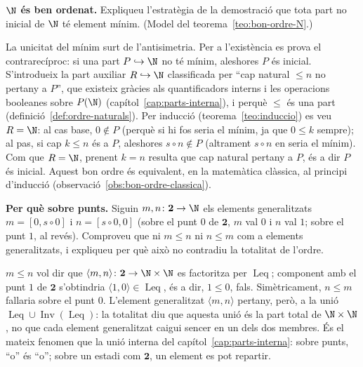 \begin{exercici}
\textbf{\(\N\) és ben ordenat.} Expliqueu l'estratègia de la demostració que tota part no inicial de \(\N\) té element mínim. (Model del teorema~\ref{teo:bon-ordre-N}.)
\end{exercici}
\begin{solucio}
La unicitat del mínim surt de l'antisimetria. Per a l'existència es prova el contrarecíproc: si una part \(P\hookrightarrow\N\) no té mínim, aleshores \(P\) és inicial. S'introdueix la part auxiliar \(R\hookrightarrow\N\) classificada per \enquote{cap natural \(\le n\) no pertany a \(P\)}, que existeix gràcies als quantificadors interns i les operacions booleanes sobre \(P(\N)\) (capítol~\ref{cap:parts-interna}), i perquè \(\le\) és una part (definició~\ref{def:ordre-naturals}). Per inducció (teorema~\ref{teo:induccio}) es veu \(R=\N\): al cas base, \(0\notin P\) (perquè si hi fos seria el mínim, ja que \(0\le k\) sempre); al pas, si cap \(k\le n\) és a \(P\), aleshores \(s\circ n\notin P\) (altrament \(s\circ n\) en seria el mínim). Com que \(R=\N\), prenent \(k=n\) resulta que cap natural pertany a \(P\), és a dir \(P\) és inicial. Aquest bon ordre és equivalent, en la matemàtica clàssica, al principi d'inducció (observació~\ref{obs:bon-ordre-classica}).
\end{solucio}

\begin{exercici}
\textbf{Per què sobre punts.} Siguin \(m,n\colon\mathbf2\to\N\) els elements generalitzats \(m=[0,s\circ0]\) i \(n=[s\circ0,0]\) (sobre el punt \(0\) de \(\mathbf2\), \(m\) val \(0\) i \(n\) val \(1\); sobre el punt \(1\), al revés). Comproveu que ni \(m\le n\) ni \(n\le m\) com a elements generalitzats, i expliqueu per què això no contradiu la totalitat de l'ordre.
\end{exercici}
\begin{solucio}
\(m\le n\) vol dir que \(\langle m,n\rangle\colon\mathbf2\to\N\times\N\) es factoritza per \(\operatorname{Leq}\); component amb el punt \(1\) de \(\mathbf2\) s'obtindria \(\langle1,0\rangle\in\operatorname{Leq}\), és a dir, \(1\le0\), fals. Simètricament, \(n\le m\) fallaria sobre el punt \(0\). L'element generalitzat \(\langle m,n\rangle\) pertany, però, a la unió \(\operatorname{Leq}\cup\operatorname{Inv}(\operatorname{Leq})\): la totalitat diu que aquesta unió és la part total de \(\N\times\N\), no que cada element generalitzat caigui sencer en un dels dos membres. És el mateix fenomen que la unió interna del capítol~\ref{cap:parts-interna}: sobre punts, \enquote{o} és \enquote{o}; sobre un estadi com \(\mathbf2\), un element es pot repartir.
\end{solucio}

